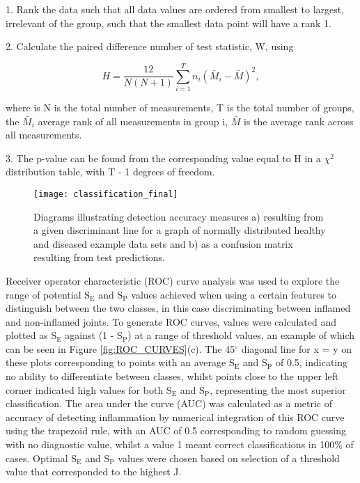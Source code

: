 \documentclass[twoside]{bhamthesis}
\theoremstyle{definition}
\begin{document}
1. Rank the data such that all data values are ordered from smallest to largest, irrelevant of the group, such that the smallest data point will have a rank 1. 

2. Calculate the paired difference number of test statistic, W, using

\begin{equation}
{ H =\frac{12}{N(N+1)} \sum_{i=1}^{T} n_i(\bar{M}_i - \bar{M})^2},
  \label{eqn:dark_noise}
\end{equation}

where is N is the total number of measurements, T is the total number of groups, the $\bar{M}_i$ average rank of all measurements in group i, $\bar{M}$ is the average rank across all measurements. 

3. The p-value can be found from the corresponding value equal to H in a $\chi^2$ distribution table, with T - 1 degrees of freedom. 

\begin{figure}[!ht]
\centering\texttt{[image: classification\_final]}
\caption{Diagrams illustrating detection accuracy measures a) resulting from a given discriminant line for a graph of normally distributed healthy and diseased example data sets and b) as a confusion matrix resulting from test predictions.}
\label{fig:confusion_matrix}
\end{figure}

Receiver operator characteristic (ROC) curve analysis was used to explore the range of potential $\mathrm{S_E}$ and $\mathrm{S_P}$ values achieved when using a certain features to distinguish between the two classes, in this case discriminating between inflamed and non-inflamed joints. To generate ROC curves, values were calculated and plotted as $\mathrm{S_E}$ against (1 - $\mathrm{S_P}$)  at a range of threshold values, an example of which can be seen in Figure \ref{fig:ROC_CURVES}(c). The 45$^\circ$ diagonal line for x = y on these plots corresponding to points with an average $\mathrm{S_E}$ and $\mathrm{S_P}$ of 0.5, indicating no ability to differentiate between classes, whilst points close to the upper left corner indicated high values for both $\mathrm{S_E}$ and $\mathrm{S_P}$, representing the most superior classification. The area under the curve (AUC) was calculated as a metric of accuracy of detecting inflammation by numerical integration of this ROC curve using the trapezoid rule, with an AUC of 0.5 corresponding to random guessing with no diagnostic value, whilst a value 1 meant correct classifications in 100\% of cases. Optimal $\mathrm{S_E}$ and $\mathrm{S_P}$ values were chosen based on selection of a threshold value that corresponded to the highest J. 
\end{document}
